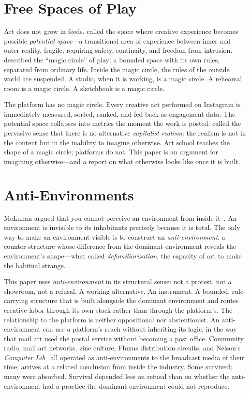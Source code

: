 \documentclass[10pt,letterpaper,twocolumn]{article}
\begin{document}
\section{Free Spaces of Play}

Art does not grow in feeds. \citet{winnicott1971playing} called the space where creative experience becomes possible \emph{potential space}---a transitional area of experience between inner and outer reality, fragile, requiring safety, continuity, and freedom from intrusion. \citet{huizinga1938homo} described the ``magic circle'' of play: a bounded space with its own rules, separated from ordinary life. Inside the magic circle, the rules of the outside world are suspended. A studio, when it is working, is a magic circle. A rehearsal room is a magic circle. A sketchbook is a magic circle.

The platform has no magic circle. Every creative act performed on Instagram is immediately measured, sorted, ranked, and fed back as engagement data. The potential space collapses into metrics the moment the work is posted. \citet{fisher2009capitalist} called the pervasive sense that there is no alternative \emph{capitalist realism}: the realism is not in the content but in the inability to imagine otherwise. Art school teaches the shape of a magic circle; platforms do not. This paper is an argument for imagining otherwise---and a report on what otherwise looks like once it is built.

\section{Anti-Environments}

McLuhan argued that you cannot perceive an environment from inside it~\citep{mcluhan1964understanding, mcluhan1969playboy}. An environment is invisible to its inhabitants precisely because it is total. The only way to make an environment visible is to construct an \emph{anti-environment}: a counter-structure whose difference from the dominant environment reveals the environment's shape---what \citet{shklovsky1917art} called \emph{defamiliarization}, the capacity of art to make the habitual strange.

This paper uses \emph{anti-environment} in its structural sense: not a protest, not a showroom, not a refusal. A working alternative. An instrument. A bounded, rule-carrying structure that is built alongside the dominant environment and routes creative labor through its own stack rather than through the platform's. The relationship to the platform is neither oppositional nor abstentionist. An anti-environment can use a platform's reach without inheriting its logic, in the way that mail art used the postal service without becoming a post office. Community radio, mail art networks, zine culture, Fluxus distribution circuits, and Nelson's \emph{Computer Lib}~\citep{nelson1974computerlib} all operated as anti-environments to the broadcast media of their time; \citet{lanier2018ten} arrives at a related conclusion from inside the industry. Some survived; many were absorbed. Survival depended less on refusal than on whether the anti-environment had a practice the dominant environment could not reproduce.
\end{document}
